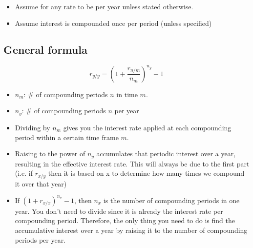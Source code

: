 \begin{warning}
    \begin{itemize}
        \item Assume for any rate to be per year unless stated otherwise. 
        \item Assume interest is compounded once per period (unless specified)
    \end{itemize}
\end{warning}

\subsection{General formula}
\begin{definition}
    \begin{equation}
        r_{y/y} = \left(1 + \frac{r_{n/m}}{n_m}\right)^{n_y} - 1 
    \end{equation}
    \begin{itemize}
        \item $n_m$: \# of compounding periods $n$ in time $m$.
        \item $n_y$: \# of compounding periods $n$ per year
    \end{itemize}
\end{definition}

\begin{intuition}
    \begin{itemize}
        \item Dividing by $n_m$ gives you the interest rate applied at each compounding period within a certain time frame $m$.
        \item Raising to the power of $n_y$ accumulates that periodic interest over a year, resulting in the effective interest rate. This will always be due to the first part (i.e. if $r_{x/y}$ then it is based on x to determine how many times we compound it over that year)
        \item If $\left(1 + r_{x/x}\right)^{n_x} -1$, then $n_x$ is the number of compounding periods in one year. You don't need to divide since it is already the interest rate per compounding period. Therefore, the only thing you need to do is find the accumulative interest over a year by raising it to the number of compounding periods per year.
    \end{itemize}
\end{intuition}